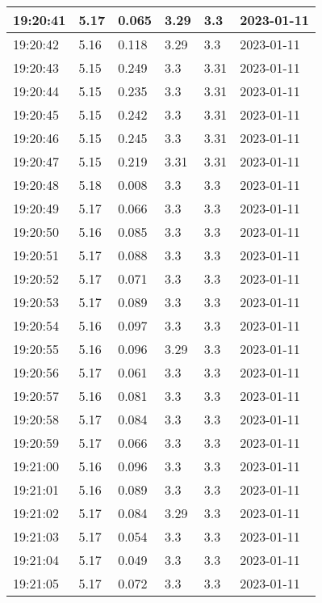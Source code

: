 \begin{longtable}{|l|l|l|l|l|l|}
        19:20:41 & 5.17 & 0.065 & 3.29 & 3.3 & 2023-01-11 \\ \hline
        19:20:42 & 5.16 & 0.118 & 3.29 & 3.3 & 2023-01-11 \\ \hline
        19:20:43 & 5.15 & 0.249 & 3.3 & 3.31 & 2023-01-11 \\ \hline
        19:20:44 & 5.15 & 0.235 & 3.3 & 3.31 & 2023-01-11 \\ \hline
        19:20:45 & 5.15 & 0.242 & 3.3 & 3.31 & 2023-01-11 \\ \hline
        19:20:46 & 5.15 & 0.245 & 3.3 & 3.31 & 2023-01-11 \\ \hline
        19:20:47 & 5.15 & 0.219 & 3.31 & 3.31 & 2023-01-11 \\ \hline
        19:20:48 & 5.18 & 0.008 & 3.3 & 3.3 & 2023-01-11 \\ \hline
        19:20:49 & 5.17 & 0.066 & 3.3 & 3.3 & 2023-01-11 \\ \hline
        19:20:50 & 5.16 & 0.085 & 3.3 & 3.3 & 2023-01-11 \\ \hline
        19:20:51 & 5.17 & 0.088 & 3.3 & 3.3 & 2023-01-11 \\ \hline
        19:20:52 & 5.17 & 0.071 & 3.3 & 3.3 & 2023-01-11 \\ \hline
        19:20:53 & 5.17 & 0.089 & 3.3 & 3.3 & 2023-01-11 \\ \hline
        19:20:54 & 5.16 & 0.097 & 3.3 & 3.3 & 2023-01-11 \\ \hline
        19:20:55 & 5.16 & 0.096 & 3.29 & 3.3 & 2023-01-11 \\ \hline
        19:20:56 & 5.17 & 0.061 & 3.3 & 3.3 & 2023-01-11 \\ \hline
        19:20:57 & 5.16 & 0.081 & 3.3 & 3.3 & 2023-01-11 \\ \hline
        19:20:58 & 5.17 & 0.084 & 3.3 & 3.3 & 2023-01-11 \\ \hline
        19:20:59 & 5.17 & 0.066 & 3.3 & 3.3 & 2023-01-11 \\ \hline
        19:21:00 & 5.16 & 0.096 & 3.3 & 3.3 & 2023-01-11 \\ \hline
        19:21:01 & 5.16 & 0.089 & 3.3 & 3.3 & 2023-01-11 \\ \hline
        19:21:02 & 5.17 & 0.084 & 3.29 & 3.3 & 2023-01-11 \\ \hline
        19:21:03 & 5.17 & 0.054 & 3.3 & 3.3 & 2023-01-11 \\ \hline
        19:21:04 & 5.17 & 0.049 & 3.3 & 3.3 & 2023-01-11 \\ \hline
        19:21:05 & 5.17 & 0.072 & 3.3 & 3.3 & 2023-01-11 \\ \hline

\end{longtable}

